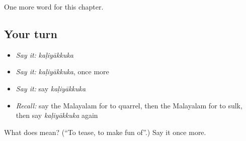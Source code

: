 \begin{grammarlens}[title={What you've built}]
One more word for this chapter.
\end{grammarlens}

\subsection*{Your turn}
\begin{itemize}
\raggedright
  \item \emph{Say it:} \emph{kaḷiyākkuka}
  \item \emph{Say it:} \emph{kaḷiyākkuka}, once more
  \item \emph{Say it:} say \emph{kaḷiyākkuka}
  \item \emph{Recall:} say the Malayalam for to quarrel, then the Malayalam for to sulk, then say \emph{kaḷiyākkuka} again
\end{itemize}

\begin{tcolorbox}[breakable,colback=teal!4,colframe=teal!35!black,title={Before you move on}]
What does  mean? (\textquotedblleft{}To tease, to make fun of\textquotedblright{}.) Say it once more.
\end{tcolorbox}
